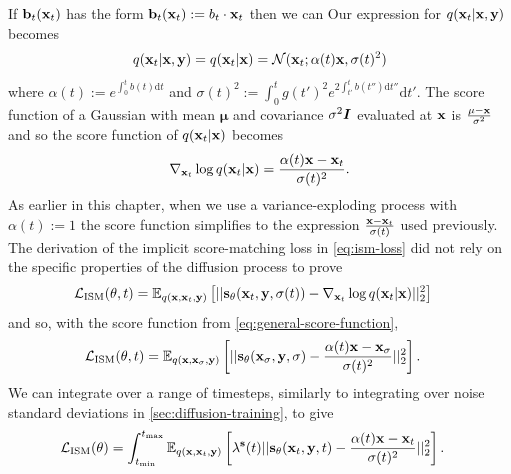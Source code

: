 If ${\mathbf{b}}_t({\mathbf{x}}_t)$ has the form ${\mathbf{b}}_t({\mathbf{x}}_t) := b_t \cdot {\mathbf{x}}_t$ then we can
Our expression for $q({\mathbf{x}}_t|{\mathbf{x}},{\mathbf{y}})$ becomes
\begin{align}
    q({\mathbf{x}}_t|{\mathbf{x}},{\mathbf{y}}) = q({\mathbf{x}}_t|{\mathbf{x}}) = {\mathcal{N}}({\mathbf{x}}_t; \alpha(t){\mathbf{x}}, \sigma(t)^2)
\end{align}
where $\alpha(t) := e^{\int_{0}^t b(t) \mathrm{d}t}$ and $\sigma(t)^2 := \int_0^t g(t')^2 e^{2\int_{t'}^{t} b(t'') \mathrm{d}t''} \mathrm{d}t'$.
The score function of a Gaussian with mean $\mathbf{\mu}$ and covariance $\sigma^2{\bm{I}}$ evaluated at ${\mathbf{x}}$ is $\frac{\mathbf{\mu} - {\mathbf{x}}}{\sigma^2}$ and so the score function of $q({\mathbf{x}}_t|{\mathbf{x}})$ becomes
\begin{equation} \label{eq:general-score-function}
    \nabla_{{\mathbf{x}}_t} \log q({\mathbf{x}}_t|{\mathbf{x}}) = \frac{\alpha(t){\mathbf{x}} - {\mathbf{x}}_t}{\sigma(t)^2}.
\end{equation}
As earlier in this chapter, when we use a variance-exploding process with $\alpha(t) := 1$ the score function simplifies to the expression $\frac{{\mathbf{x}}-{\mathbf{x}}_t}{\sigma(t)}$ used previously. The derivation of the implicit score-matching loss in \cref{eq:ism-loss} did not rely on the specific properties of the diffusion process to prove
\begin{align}
    \mathcal{L}_\text{ISM}(\theta, t) &= \mathbb{E}_{q({\mathbf{x}}, {\mathbf{x}}_t, {\mathbf{y}})} \left[ 
    || {\mathbf{s}}_\theta({\mathbf{x}}_t, {\mathbf{y}}, \sigma(t)) - \nabla_{{\mathbf{x}}_t} \log q({\mathbf{x}}_t | {\mathbf{x}}) ||_2^2 \right]
\end{align}
and so, with the score function from \cref{eq:general-score-function},
\begin{align}
    \mathcal{L}_\text{ISM}(\theta, t) &= \mathbb{E}_{q({\mathbf{x}}, {\mathbf{x}}_\sigma, {\mathbf{y}})} \left[
    || {\mathbf{s}}_\theta({\mathbf{x}}_\sigma, {\mathbf{y}}, \sigma) - \frac{\alpha(t) {\mathbf{x}}-{\mathbf{x}}_\sigma}{\sigma(t)^2} ||_2^2 \right].
\end{align}
We can integrate over a range of timesteps, similarly to integrating over noise standard deviations in \cref{sec:diffusion-training}, to give 
\begin{align} \label{eq:general-score-diffusion-loss}
    \mathcal{L}_\text{ISM}(\theta) &= \int_{t_\text{min}}^{t_\text{max}} \mathbb{E}_{q({\mathbf{x}}, {\mathbf{x}}_t, {\mathbf{y}})} \left[
    \lambda^{\mathbf{s}}(t) || {\mathbf{s}}_\theta({\mathbf{x}}_t, {\mathbf{y}}, t) - \frac{\alpha(t) {\mathbf{x}}-{\mathbf{x}}_t}{\sigma(t)^2} ||_2^2 \right].
\end{align}

